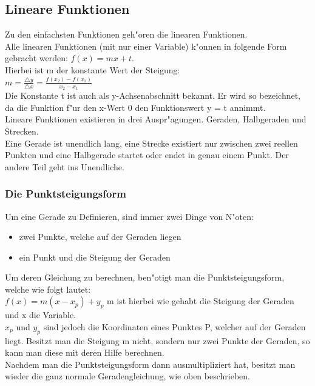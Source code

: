 \subsection{Lineare Funktionen}
Zu den einfachsten Funktionen geh"oren die linearen Funktionen.\\
Alle linearen Funktionen (mit nur einer Variable) k"onnen in folgende Form gebracht werden: $f(x) = mx+t$.\\
Hierbei ist m der konstante Wert der Steigung:\\
$m= \frac{\triangle y}{\triangle x}=\frac{f(x_2)-f(x_1)}{x_2-x_1}$\\
Die Konstante t ist auch als y-Achsenabschnitt bekannt. Er wird so bezeichnet, da die Funktion f"ur den x-Wert 0 den Funktionswert y = t annimmt.\\
Lineare Funktionen existieren in drei Auspr"agungen. Geraden, Halbgeraden und Strecken.\\
Eine Gerade ist unendlich lang, eine Strecke existiert nur zwischen zwei reellen Punkten und eine Halbgerade startet oder endet in genau einem Punkt. Der andere Teil geht ins Unendliche.

\subsubsection{Die Punktsteigungsform}
Um eine Gerade zu Definieren, sind immer zwei Dinge von N"oten:
\begin{itemize}
\item zwei Punkte, welche auf der Geraden liegen
\item ein Punkt und die Steigung der Geraden
\end{itemize}
Um deren Gleichung zu berechnen, ben"otigt man die Punktsteigungsform, welche wie folgt lautet:\\
$ f(x) = m(x-x_p) + y_p $
m ist hierbei wie gehabt die Steigung der Geraden und x die Variable. \\
$x_p$ und $y_p$ sind jedoch die Koordinaten eines Punktes P, welcher auf der Geraden liegt.
Besitzt man die Steigung m nicht, sondern nur zwei Punkte der Geraden, so kann man diese mit deren Hilfe berechnen.\\
Nachdem man die Punktsteigungsform dann ausmultipliziert hat, besitzt man wieder die ganz normale Geradengleichung, wie oben beschrieben.

